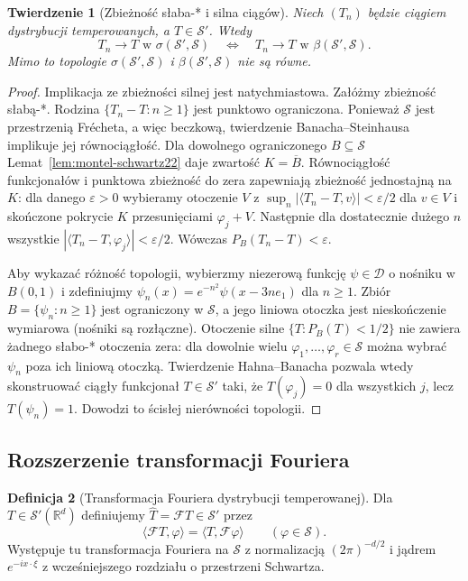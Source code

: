 \documentclass[11pt,a4paper]{article}
\numberwithin{equation}{section}
\theoremstyle{plain}
\newtheorem{twierdzenie}{Twierdzenie}[section]
\theoremstyle{definition}
\newtheorem{definicja}[twierdzenie]{Definicja}
\theoremstyle{remark}
\newcommand{\R}{\mathbb R}
\begin{document}
\begin{twierdzenie}[Zbieżność słaba-* i silna ciągów]
\label{thm:seq-topologies-schwartz22}
Niech $(T_n)$ będzie ciągiem dystrybucji temperowanych,
a $T\in\mathcal S'$. Wtedy
\[
T_n\longrightarrow T\text{ w }\sigma(\mathcal S',\mathcal S)
\quad\Longleftrightarrow\quad
T_n\longrightarrow T\text{ w }\beta(\mathcal S',\mathcal S).
\]
Mimo to topologie $\sigma(\mathcal S',\mathcal S)$ i
$\beta(\mathcal S',\mathcal S)$ nie są równe.
\end{twierdzenie}
\begin{proof}
Implikacja ze zbieżności silnej jest natychmiastowa.
Załóżmy zbieżność słabą-*. Rodzina
$\{T_n-T:n\ge1\}$ jest punktowo ograniczona.
Ponieważ $\mathcal S$ jest przestrzenią Frécheta,
a więc beczkową, twierdzenie Banacha--Steinhausa
implikuje jej równociągłość.
Dla dowolnego ograniczonego $B\subseteq\mathcal S$
Lemat~\ref{lem:montel-schwartz22} daje zwartość
$K=\overline B$. Równociągłość funkcjonałów i
punktowa zbieżność do zera zapewniają zbieżność
jednostajną na $K$: dla danego $\varepsilon>0$
wybieramy otoczenie $V$ z
$\sup_n|\langle T_n-T,v\rangle|<\varepsilon/2$
dla $v\in V$ i skończone pokrycie $K$ przesunięciami
$\varphi_j+V$. Następnie dla dostatecznie dużego $n$
wszystkie $|\langle T_n-T,\varphi_j\rangle|<\varepsilon/2$.
Wówczas $P_B(T_n-T)<\varepsilon$.

Aby wykazać różność topologii, wybierzmy niezerową funkcję
$\psi\in\mathcal D$ o nośniku w $B(0,1)$ i zdefiniujmy
$\psi_n(x)=e^{-n^2}\psi(x-3ne_1)$ dla $n\ge1$.
Zbiór $B=\{\psi_n:n\ge1\}$ jest ograniczony w
$\mathcal S$, a jego liniowa otoczka jest
nieskończenie wymiarowa (nośniki są rozłączne).
Otoczenie silne $\{T:P_B(T)<1/2\}$ nie zawiera
żadnego słabo-* otoczenia zera: dla dowolnie wielu
$\varphi_1,\ldots,\varphi_r\in\mathcal S$
można wybrać $\psi_n$ poza ich liniową otoczką.
Twierdzenie Hahna--Banacha pozwala wtedy skonstruować
ciągły funkcjonał $T\in\mathcal S'$ taki, że
$T(\varphi_j)=0$ dla wszystkich $j$, lecz
$T(\psi_n)=1$. Dowodzi to ścisłej nierówności topologii.
\end{proof}

\subsection{Rozszerzenie transformacji Fouriera}

\begin{definicja}[Transformacja Fouriera dystrybucji temperowanej]
\label{def:fourier-tempered22}
Dla $T\in\mathcal S'(\R^d)$ definiujemy
$\widehat T=\mathcal F T\in\mathcal S'$ przez
\[
\langle\mathcal F T,\varphi\rangle
=\langle T,\mathcal F\varphi\rangle
\qquad(\varphi\in\mathcal S).
\]
Występuje tu transformacja Fouriera na $\mathcal S$
z normalizacją $(2\pi)^{-d/2}$ i jądrem
$e^{-ix\cdot\xi}$ z wcześniejszego rozdziału o przestrzeni Schwartza.
\end{definicja}
\end{document}
